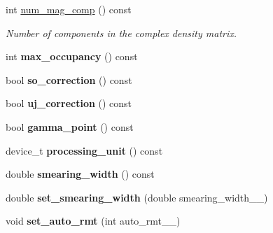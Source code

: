 \begin{DoxyCompactItemize}
\item 
int \hyperlink{classsirius_1_1_simulation__parameters_a13217a27744c9b02181b3702a7a2b70d}{num\+\_\+mag\+\_\+comp} () const 
\begin{DoxyCompactList}\small\item\em Number of components in the complex density matrix. \end{DoxyCompactList}\item 
\hypertarget{classsirius_1_1_simulation__parameters_ab5b593ab226e0ce503c3c3431b7de15a}{}int {\bfseries max\+\_\+occupancy} () const \label{classsirius_1_1_simulation__parameters_ab5b593ab226e0ce503c3c3431b7de15a}

\item 
\hypertarget{classsirius_1_1_simulation__parameters_a408e5adebc1a9a30da8864021abce8e8}{}bool {\bfseries so\+\_\+correction} () const \label{classsirius_1_1_simulation__parameters_a408e5adebc1a9a30da8864021abce8e8}

\item 
\hypertarget{classsirius_1_1_simulation__parameters_a936f3a7a3681b7284fd22a9acd3409ac}{}bool {\bfseries uj\+\_\+correction} () const \label{classsirius_1_1_simulation__parameters_a936f3a7a3681b7284fd22a9acd3409ac}

\item 
\hypertarget{classsirius_1_1_simulation__parameters_a0d810e39365e2bf37b3ff7fec3fb4167}{}bool {\bfseries gamma\+\_\+point} () const \label{classsirius_1_1_simulation__parameters_a0d810e39365e2bf37b3ff7fec3fb4167}

\item 
\hypertarget{classsirius_1_1_simulation__parameters_a755a4cbf7fa78ecb62cf1eab15cf8135}{}device\+\_\+t {\bfseries processing\+\_\+unit} () const \label{classsirius_1_1_simulation__parameters_a755a4cbf7fa78ecb62cf1eab15cf8135}

\item 
\hypertarget{classsirius_1_1_simulation__parameters_a66003287f6c1b3454b0e8250e611c415}{}double {\bfseries smearing\+\_\+width} () const \label{classsirius_1_1_simulation__parameters_a66003287f6c1b3454b0e8250e611c415}

\item 
\hypertarget{classsirius_1_1_simulation__parameters_a13bf7a5115f2ade2459033565be1f512}{}double {\bfseries set\+\_\+smearing\+\_\+width} (double smearing\+\_\+width\+\_\+\+\_\+)\label{classsirius_1_1_simulation__parameters_a13bf7a5115f2ade2459033565be1f512}

\item 
\hypertarget{classsirius_1_1_simulation__parameters_a3de03f2f64ce18a2cbd4934d74c4d548}{}void {\bfseries set\+\_\+auto\+\_\+rmt} (int auto\+\_\+rmt\+\_\+\+\_\+)\label{classsirius_1_1_simulation__parameters_a3de03f2f64ce18a2cbd4934d74c4d548}


\end{DoxyCompactItemize}
